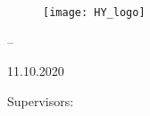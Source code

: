 \begin{titlepage}{
    \centering
    
    \begin{figure}[H]
        \centering
        \texttt{[image: HY\_logo]}
    \end{figure}
    
    \bigskip
    \bigskip
    \bigskip
    \mythesis \par
    \mysubject \par
    \mySpecSubject \par
    
    \bigskip
    \bigskip
    \MakeUppercase{\mytitle} -- \par
    \mysubtitle \par
    
    \bigskip
    \bigskip
    \myname
    
    11.10.2020
    
    \vfill
    
    Supervisors: \par
    \mysupervisors \par
    \bigskip
    \bigskip
    \bigskip
    \MakeUppercase{\myuni} \par
    \MakeUppercase{\myfaculty} \par
    \MakeUppercase{\mydept} \par
    \MakeUppercase{\mysubject} \par
    \addressFirst \par
    \addressSecond \par
}
\end{titlepage}